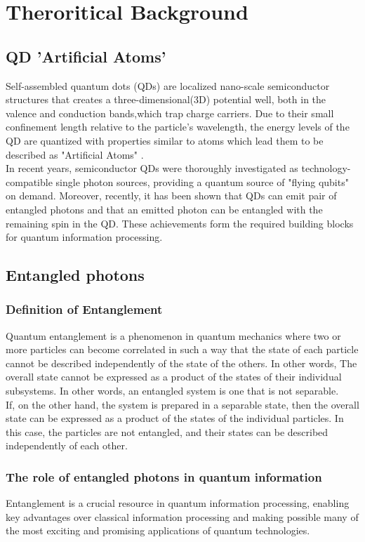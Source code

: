 \section{Theroritical Background}
\subsection{QD 'Artificial Atoms'}
Self-assembled quantum dots (QDs) are localized nano-scale semiconductor structures that creates a three-dimensional(3D) potential well, both in the valence and conduction bands,which trap charge carriers. Due to their small confinement length relative to the particle's wavelength, the energy levels of the QD are quantized with properties similar to atoms which lead them to be described as "Artificial Atoms" \cite{Kastner1993}. \\
In recent years, semiconductor QDs were thoroughly investigated as technology-compatible single photon sources, providing a quantum source of "flying qubits" on demand.\cite{Dekel2000,Michler2000,Michler2000_1,Yuan2002} Moreover, recently, it has been shown that QDs can emit pair of entangled photons \cite{Akopian2006,Hafenbrak2007} and that an emitted photon can be entangled with the remaining spin in the QD. \cite{Pelk2012,Schaibley2013,Gao2012} These achievements form the required building blocks for quantum information processing. \cite{DiVincenzo1998,Duan2001}\\
\subsection{Entangled photons}
\subsubsection{Definition of Entanglement}
Quantum entanglement is a phenomenon in quantum mechanics where two or more particles can become correlated in such a way that the state of each particle cannot be described independently of the state of the others. 
 In other words, The overall state cannot be expressed as a product of the states of their individual subsystems. In other words, an entangled system is one that is not separable.\\
 If, on the other hand, the system is prepared in a separable state, then the overall state can be expressed as a product of the states of the individual particles. In this case, the particles are not entangled, and their states can be described independently of each other.
\subsubsection{The role of entangled photons in quantum information}
Entanglement is a crucial resource in quantum information processing, enabling key advantages over classical information processing and making possible many of the most exciting and promising applications of quantum technologies.
